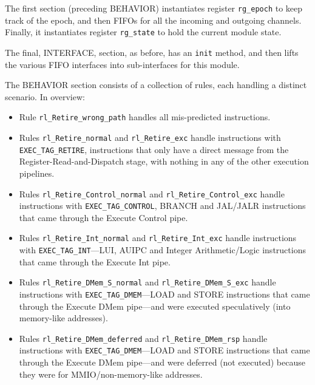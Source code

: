The first section (preceding BEHAVIOR) instantiates register
\verb|rg_epoch| to keep track of the epoch, and then FIFOs for all the
incoming and outgoing channels.  Finally, it instantiates register
\verb|rg_state| to hold the current module state.

The final, INTERFACE, section, as before, has an \verb|init| method,
and then lifts the various FIFO interfaces into sub-interfaces for
this module.

The BEHAVIOR section consists of a collection of rules, each handling
a distinct scenario.  In overview:

\begin{itemize}

  \item Rule \verb|rl_Retire_wrong_path| handles all mis-predicted
        instructions.

  \item Rules \verb|rl_Retire_normal| and \verb|rl_Retire_exc| handle
        instructions with \verb|EXEC_TAG_RETIRE|, {\ie} instructions
        that only have a direct message from the
        Register-Read-and-Dispatch stage, with nothing in any of the
        other execution pipelines.

  \item Rules \verb|rl_Retire_Control_normal| and
        \verb|rl_Retire_Control_exc| handle instructions with
        \verb|EXEC_TAG_CONTROL|, {\ie} BRANCH and JAL/JALR
        instructions that came through the Execute Control pipe.

  \item Rules \verb|rl_Retire_Int_normal| and \verb|rl_Retire_Int_exc|
        handle instructions with \verb|EXEC_TAG_INT|---LUI, AUIPC and
        Integer Arithmetic/Logic instructions that came through the
        Execute Int pipe.

  \item Rules \verb|rl_Retire_DMem_S_normal| and
        \verb|rl_Retire_DMem_S_exc| handle instructions with
        \verb|EXEC_TAG_DMEM|---LOAD and STORE instructions that came
        through the Execute DMem pipe---and were executed
        speculatively (into memory-like addresses).

  \item Rules \verb|rl_Retire_DMem_deferred| and
        \verb|rl_Retire_DMem_rsp| handle instructions with
        \verb|EXEC_TAG_DMEM|---LOAD and STORE instructions that came
        through the Execute DMem pipe---and were deferred (not
        executed) because they were for MMIO/non-memory-like addresses.

\end{itemize}

